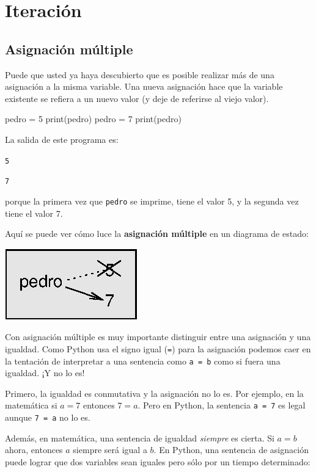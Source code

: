 
\chapter{Iteración }


\section{Asignación múltiple}

  

Puede que usted ya haya descubierto que es posible realizar más de
una asignación a la misma variable. Una nueva asignación hace que
la variable existente se refiera a un nuevo valor (y deje de referirse
al viejo valor).

\begin{pythoncode}
pedro = 5
print(pedro)
pedro = 7
print(pedro)
\end{pythoncode}
 La salida de este programa es:

\texttt{5 }

\texttt{7} 

porque la primera vez que \texttt{pedro} se imprime, tiene el valor
5, y la segunda vez tiene el valor 7.

Aquí se puede ver cómo luce la \textbf{asignación múltiple } en un
diagrama de estado:

\beforefig \centerline{\includegraphics{illustrations/assign2}}
\afterfig

Con asignación múltiple es muy importante distinguir entre una asignación
y una igualdad. Como Python usa el signo igual (\texttt{=}) para la
asignación podemos caer en la tentación de interpretar a una sentencia
como \texttt{a = b} como si fuera una igualdad. ¡Y no lo es!

Primero, la igualdad es conmutativa y la asignación no lo es. Por
ejemplo, en la matemática si $a=7$ entonces $7=a$. Pero en Python,
la sentencia \texttt{a = 7} es legal aunque \texttt{7 = a} no lo es.

Además, en matemática, una sentencia de igualdad \textit{siempre}
es cierta. Si $a=b$ ahora, entonces $a$ siempre será igual a $b$.
En Python, una sentencia de asignación puede lograr que dos variables
sean iguales pero sólo por un tiempo determinado:

